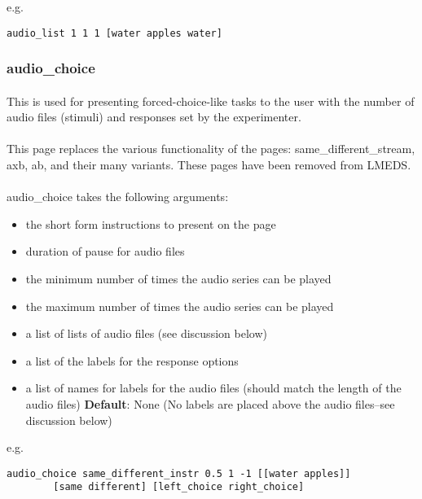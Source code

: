 e.g.
\begin{lstlisting}
audio_list 1 1 1 [water apples water]
\end{lstlisting}

\subsubsection{audio\_choice}

\paragraph{}
This is used for presenting forced-choice-like tasks to the user with the number of audio files (stimuli) and responses set by the experimenter.

\paragraph{}
This page replaces the various functionality of the pages: same\_different\_stream, axb, ab, and their many variants.  These pages have been removed from LMEDS.

\paragraph{}
audio\_choice takes the following arguments:

\begin{itemize}
\item the short form instructions to present on the page
\item duration of pause for audio files
\item the minimum number of times the audio series can be played
\item the maximum number of times the audio series can be played
\item a list of lists of audio files (see discussion below)
\item a list of the labels for the response options
\item a list of names for labels for the audio files (should match the length of the audio files) \textbf{Default}: None (No labels are placed above the audio files--see discussion below)
\end{itemize}

e.g.
\begin{lstlisting}
audio_choice same_different_instr 0.5 1 -1 [[water apples]]
		[same different] [left_choice right_choice]
\end{lstlisting}

